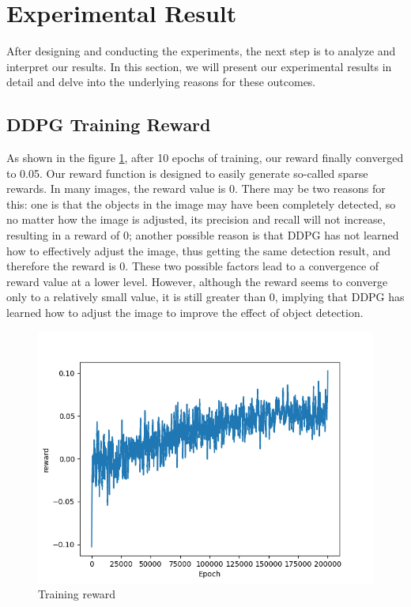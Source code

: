 \documentclass{PHlab-thesis}
\begin{document}
\section{Experimental Result}
After designing and conducting the experiments, the next step is to analyze and interpret our results. In this section, we will present our experimental results in detail and delve into the underlying reasons for these outcomes.

\subsection{DDPG Training Reward}
As shown in the figure \ref{Fig.Training reward}, after 10 epochs of training, our reward finally converged to 0.05. Our reward function is designed to easily generate so-called sparse rewards. In many images, the reward value is 0. There may be two reasons for this: one is that the objects in the image may have been completely detected, so no matter how the image is adjusted, its precision and recall will not increase, resulting in a reward of 0; another possible reason is that DDPG has not learned how to effectively adjust the image, thus getting the same detection result, and therefore the reward is 0. These two possible factors lead to a convergence of reward value at a lower level. However, although the reward seems to converge only to a relatively small value, it is still greater than 0, implying that DDPG has learned how to adjust the image to improve the effect of object detection.
\begin{figure}[H] 
    \centering 
    \includegraphics[width=\textwidth]{images/training reward.png}
    \caption{Training reward} 
    \label{Fig.Training reward} 
\end{figure}
\end{document}
